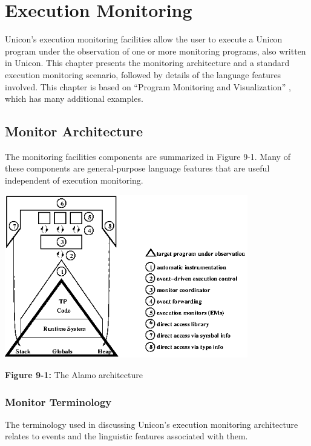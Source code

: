 \chapter{Execution Monitoring}

Unicon's execution monitoring facilities allow the user to execute a Unicon
program under the observation of one or more monitoring programs, also
written in Unicon.  This chapter presents the monitoring architecture and a
standard execution monitoring scenario, followed by details of the language
features involved.  This chapter is based on ``Program Monitoring and
Visualization'' \cite{Jeff99}, which has many additional examples.

\section{Monitor Architecture}

The monitoring facilities components are summarized in Figure 9-1.
Many of these components are general-purpose language features that are
useful independent of execution monitoring.

\begin{center}
\includegraphics[height=2.8in]{alamarch.png}
\end{center}

{\sffamily\bfseries Figure 9-1:}
{\sffamily The Alamo architecture}

\bigskip

\subsection{Monitor Terminology}

The terminology used in discussing Unicon's execution monitoring
architecture relates to events and the linguistic features associated with
them.



